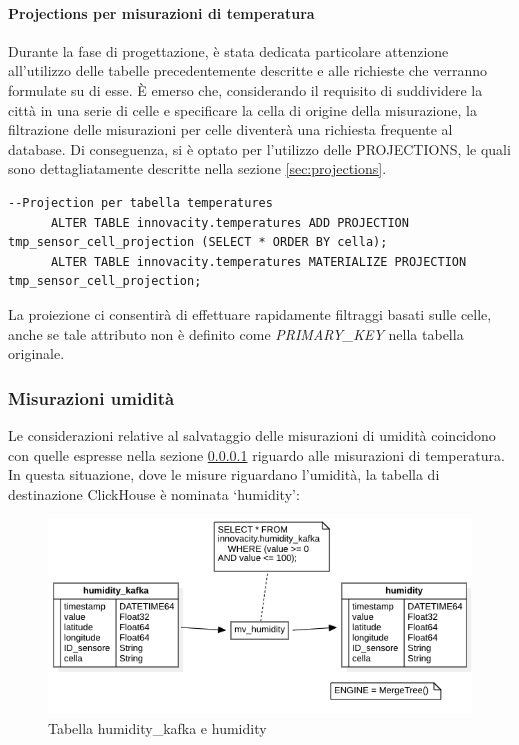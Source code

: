     \paragraph{Projections per misurazioni di temperatura} \label{sec:temp_projections}
    Durante la fase di progettazione, è stata dedicata particolare attenzione all'utilizzo delle tabelle precedentemente descritte e alle richieste che verranno formulate su di esse. È emerso che, considerando il requisito di suddividere la città in una serie di celle e specificare la cella di origine della misurazione, la filtrazione delle misurazioni per celle diventerà una richiesta frequente al database. Di conseguenza, si è optato per l'utilizzo delle PROJECTIONS, le quali sono dettagliatamente descritte nella sezione \ref{sec:projections}.
    \vspace{0,3cm}
    \begin{lstlisting}[caption={Esempio di proiezione e materializzazione in una tabella}, captionpos=b]
      --Projection per tabella temperatures
      ALTER TABLE innovacity.temperatures ADD PROJECTION tmp_sensor_cell_projection (SELECT * ORDER BY cella);
      ALTER TABLE innovacity.temperatures MATERIALIZE PROJECTION tmp_sensor_cell_projection;
  \end{lstlisting}
    \vspace{0,3cm}
    La proiezione ci consentirà di effettuare rapidamente filtraggi basati sulle celle, anche se tale attributo non è definito come \textit{PRIMARY\_KEY} nella tabella originale.

\subsubsection{Misurazioni umidità}
Le considerazioni relative al salvataggio delle misurazioni di umidità coincidono con quelle espresse nella sezione \ref{sec:temp_projections} riguardo alle misurazioni di temperatura.
In questa situazione, dove le misure riguardano l’umidità, la tabella di destinazione ClickHouse è nominata ‘humidity’:

\begin{figure}[H]
    \centering
    \includegraphics[width=1\textwidth]{../Images/SpecificaTecnica/humidity.png}
    \caption{Tabella humidity\_kafka e humidity}
    \label{fig:humidity_tables}
  \end{figure}

